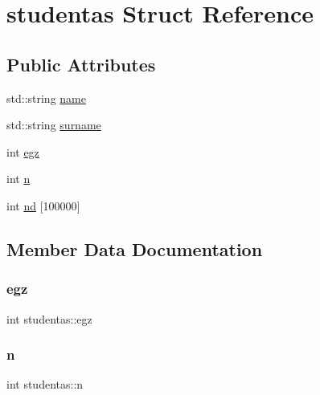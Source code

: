 \hypertarget{structstudentas}{}\section{studentas Struct Reference}
\label{structstudentas}
\subsection*{Public Attributes}
\begin{DoxyCompactItemize}
\item 
std\+::string \mbox{\hyperlink{structstudentas_af08a55c2b6289178e20c94d33df3cef8}{name}}
\item 
std\+::string \mbox{\hyperlink{structstudentas_ae8ce90faad9e79990e9a6e38f5f2a7e7}{surname}}
\item 
int \mbox{\hyperlink{structstudentas_a77793375d5560caf680ece7487d2be99}{egz}}
\item 
int \mbox{\hyperlink{structstudentas_a66eb6a34c66d55fd7a54cbd4ba7c8d8b}{n}}
\item 
int \mbox{\hyperlink{structstudentas_a06c14f55fec7773185b110e414e232b7}{nd}} \mbox{[}100000\mbox{]}
\end{DoxyCompactItemize}


\subsection{Member Data Documentation}
\mbox{\label{structstudentas_a77793375d5560caf680ece7487d2be99}} 
\subsubsection{\texorpdfstring{egz}{egz}}
{\footnotesize\ttfamily int studentas\+::egz}

\mbox{\label{structstudentas_a66eb6a34c66d55fd7a54cbd4ba7c8d8b}} 
\subsubsection{\texorpdfstring{n}{n}}
{\footnotesize\ttfamily int studentas\+::n}

\mbox{\label{structstudentas_af08a55c2b6289178e20c94d33df3cef8}} 
